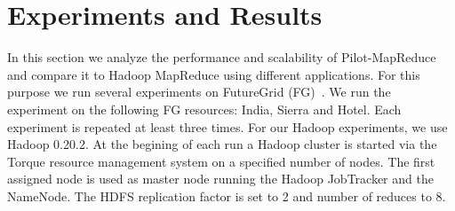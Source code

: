 \documentclass{acm_proc_article-sp}
\newcommand{\alnote}[1]{ {\textcolor{blue} { ***andreL: #1 }}}
\newcommand{\alnote}[1]{}
\newcommand{\upp}{\vspace*{-0.5em}}
\newcommand{\pilotmapreduce}{Pilot-MapReduce\xspace}
\begin{document}





\upp
\section{Experiments and Results}
\label{sec-experiments}


In this section we analyze the performance and scalability of
\pilotmapreduce and compare it to Hadoop MapReduce using different
applications. For this purpose we run several experiments on
FutureGrid (FG)~\cite{fg}. We run the experiment on the following FG
resources: India, Sierra and Hotel. Each experiment is repeated at
least three times. For our Hadoop experiments, we use Hadoop
0.20.2. At the begining of each run a Hadoop cluster is started via
the Torque resource management system on a specified number of
nodes. The first assigned node is used as master node running the
Hadoop JobTracker and the NameNode. The HDFS replication factor is set
to 2 and number of reduces to 8.  \upp
\end{document}

